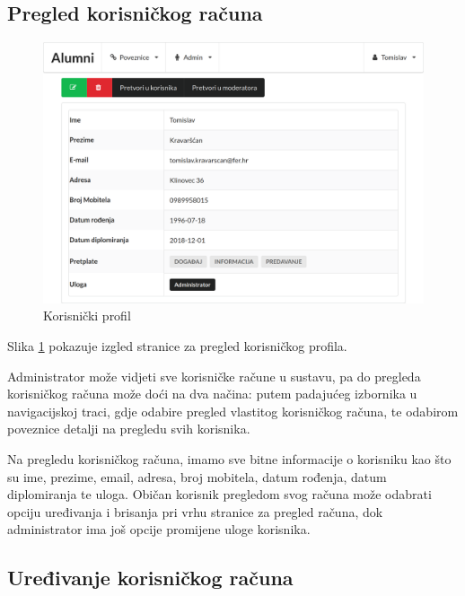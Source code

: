 \documentclass[zavrsni, numeric]{fer}
\begin{document}
\subsection{Pregled korisničkog računa}

\begin{figure}[H]
	\centering
	\includegraphics[width=13cm]{slike/profil.png}
	\caption{Korisnički profil}
	\label{fig:profil}
\end{figure}

Slika \ref{fig:profil} pokazuje izgled stranice za pregled korisničkog profila.

Administrator može vidjeti sve korisničke račune u sustavu, pa do pregleda korisničkog računa može doći na dva načina: putem padajućeg izbornika u navigacijskoj traci, gdje odabire pregled vlastitog korisničkog računa, te odabirom poveznice detalji na pregledu svih korisnika.

Na pregledu korisničkog računa, imamo sve bitne informacije o korisniku kao što su ime, prezime, email, adresa, broj mobitela, datum rođenja, datum diplomiranja te uloga. Običan korisnik pregledom svog računa može odabrati opciju uređivanja i brisanja pri vrhu stranice za pregled računa, dok administrator ima još opcije promijene uloge korisnika.

\subsection{Uređivanje korisničkog računa}
\end{document}
